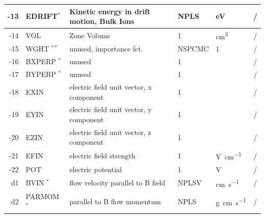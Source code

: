 \begin{landscape}
\begin{longtable}{|r|l|l|l|l|c|}
    \\ \hline
    -13                    & EDRIFT$^*$                   & Kinetic energy in drift
    motion, Bulk Ions      & NPLS                         & \si{\electronvolt}                & /
    \\ \hline
    -14                    & VOL                          & Zone Volume
			   & 1                            & \si{\cubic\centi\metre}           & /
    \\ \hline
    -15                    & WGHT $^{**}
    $                      & unused, importance fct.
			   & NSPCMC                       & $ 1 $
			   & /
    \\ \hline
    -16                    & BXPERP $^*$                  & unused
			   & 1                            &                                   & /
    \\ \hline
    -17                    & BYPERP $^*$                  & unused
			   & 1                            &                                   & /
    \\ \hline
    -18                    & EXIN                         & electric field unit vector,
    x component            & 1                            &                                   & /
    \\ \hline
    -19                    & EYIN                         & electric field unit vector,
    y component            & 1                            &                                   & /
    \\ \hline
    -20                    & EZIN                         & electric field unit vector,
    z component            & 1                            &                                   & /
    \\ \hline
    -21                    & EFIN                         & electric field strength
			   & 1                            & \si{\volt\per\centi\metre}        & /
    \\ \hline
    -22                    & POT                          & electric potential
			   & 1                            & \si{\volt}                        & /
    \\ \hline\hline
    d1                     & BVIN $^*$                    & flow velocity parallel to B
    field                  & NPLSV                        & \si{\centi\metre\per\second}      & /
    \\ \hline
    d2                     & PARMOM $^*$                  & parallel to B flow momentum
			   & NPLS                         & \si{\gram\centi\metre\per\second} & /

\end{longtable}
\end{landscape}
